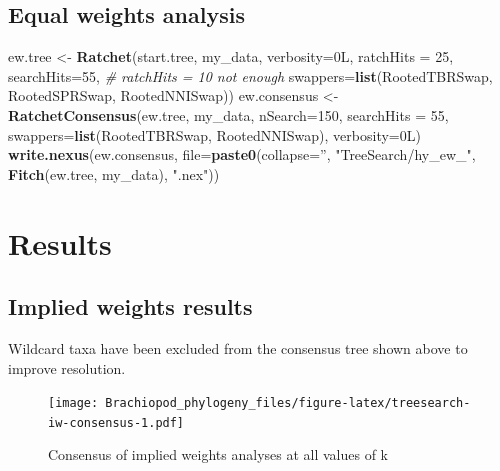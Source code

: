 \documentclass[]{book}
\newenvironment{Shaded}{\begin{snugshade}}{\end{snugshade}}
\newcommand{\KeywordTok}[1]{\textcolor[rgb]{0.13,0.29,0.53}{\textbf{#1}}}
\newcommand{\DataTypeTok}[1]{\textcolor[rgb]{0.13,0.29,0.53}{#1}}
\newcommand{\DecValTok}[1]{\textcolor[rgb]{0.00,0.00,0.81}{#1}}
\newcommand{\StringTok}[1]{\textcolor[rgb]{0.31,0.60,0.02}{#1}}
\newcommand{\CommentTok}[1]{\textcolor[rgb]{0.56,0.35,0.01}{\textit{#1}}}
\newcommand{\NormalTok}[1]{#1}
\theoremstyle{definition}
\theoremstyle{definition}
\theoremstyle{definition}
\theoremstyle{remark}
\begin{document}
\hypertarget{equal-weights-analysis}{%
\subsection{Equal weights analysis}\label{equal-weights-analysis}}

\begin{Shaded}
\begin{Highlighting}[]
\NormalTok{ew.tree <-}\StringTok{ }\KeywordTok{Ratchet}\NormalTok{(start.tree, my_data, }\DataTypeTok{verbosity=}\NormalTok{0L,}
                   \DataTypeTok{ratchHits =} \DecValTok{25}\NormalTok{, }\DataTypeTok{searchHits=}\DecValTok{55}\NormalTok{, }\CommentTok{# ratchHits = 10 not enough}
                   \DataTypeTok{swappers=}\KeywordTok{list}\NormalTok{(RootedTBRSwap, RootedSPRSwap, RootedNNISwap))}
\NormalTok{ew.consensus <-}\StringTok{ }\KeywordTok{RatchetConsensus}\NormalTok{(ew.tree, my_data, }\DataTypeTok{nSearch=}\DecValTok{150}\NormalTok{, }\DataTypeTok{searchHits =} \DecValTok{55}\NormalTok{,}
                                 \DataTypeTok{swappers=}\KeywordTok{list}\NormalTok{(RootedTBRSwap, RootedNNISwap),}
                                 \DataTypeTok{verbosity=}\NormalTok{0L)}
\KeywordTok{write.nexus}\NormalTok{(ew.consensus, }\DataTypeTok{file=}\KeywordTok{paste0}\NormalTok{(}\DataTypeTok{collapse=}\StringTok{''}\NormalTok{, }\StringTok{"TreeSearch/hy_ew_"}\NormalTok{,}
                                      \KeywordTok{Fitch}\NormalTok{(ew.tree, my_data), }\StringTok{".nex"}\NormalTok{))}
\end{Highlighting}
\end{Shaded}

\hypertarget{results}{%
\section{Results}\label{results}}

\hypertarget{implied-weights-results}{%
\subsection{Implied weights results}\label{implied-weights-results}}

Wildcard taxa have been excluded from the consensus tree shown above to
improve resolution.

\begin{figure}
\centering
\texttt{[image: Brachiopod\_phylogeny\_files/figure-latex/treesearch-iw-consensus-1.pdf]}
\caption{\label{fig:treesearch-iw-consensus}Consensus of implied weights
analyses at all values of k}
\end{figure}
\end{document}
